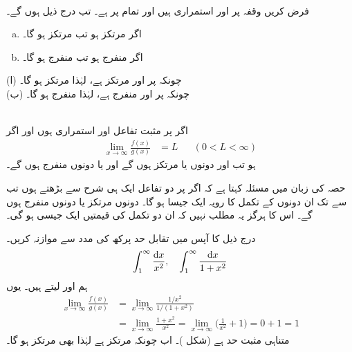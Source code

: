 \\
فرض کریں وقفہ \عددی{[a,\infty)} پر  اور  استمراری ہیں اور تمام  پر  ہے۔ تب درج ذیل ہوں  گے۔
\begin{enumerate}[a.]
\item
اگر  مرتکز ہو تب  مرتکز ہو گا۔
\item
اگر  منفرج ہو تب  منفرج ہو گا۔
\end{enumerate}

(ا) چونکہ \عددی{[1,\infty)} پر  اور   مرتکز ہے، لہٰذا   مرتکز ہو گا۔\\
(ب) چونکہ \عددی{[1,\infty)} پر  اور   منفرج  ہے،  لہٰذا   منفرج ہو گا۔


\\
اگر \عددی{[a,\infty)} پر مثبت تفاعل  اور  استمراری ہوں اور اگر
\begin{align*}
\lim_{x\to\infty}\frac{f(x)}{g(x)}&=L&&(0<L<\infty)
\end{align*}
ہو تب  اور  دونوں یا مرتکز ہوں گے اور یا دونوں منفرج ہوں گے۔

حصہ  کی زبان میں مسئلہ  کہتا ہے کہ اگر  پر  دو تفاعل ایک ہی شرح سے بڑھتے ہوں تب  سے  تک ان دونوں کے تکمل کا رویہ ایک  جیسا ہو گا۔ دونوں مرتکز یا دونوں منفرج ہوں گے۔ اس کا ہرگز یہ مطلب نہیں  کہ ان دو تکمل کی قیمتیں  ایک جیسی ہو گی۔

درج ذیل کا آپس میں تقابل حد پرکھ کی مدد سے موازنہ کریں۔
\begin{align*}
\int_1^{\infty}\frac{\dif x}{x^2},\quad \int_1^{\infty}\frac{\dif x}{1+x^2}
\end{align*}
ہم  اور  لیتے ہیں۔ یوں
\begin{align*}
\lim_{x\to\infty}\frac{f(x)}{g(x)}&=\lim_{x\to \infty}\frac{1/x^2}{1/(1+x^2)}\\
&=\lim_{x\to\infty}\frac{1+x^2}{x^2}=\lim_{x\to\infty}\big(\frac{1}{x^2}+1\big)=0+1=1
\end{align*}
متناہی مثبت حد ہے (شکل )۔ اب چونکہ  مرتکز ہے لہٰذا  بھی مرتکز ہو گا۔

